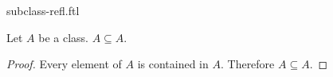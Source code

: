 \documentclass{stex}
\begin{document}
\begin{smodule}{subclass-refl.ftl}

  \begin{forthel}
  \end{forthel}

  \begin{forthel}
    \begin{proposition}
      Let $A$ be a class.
      $A \subseteq A$.
    \end{proposition}
    \begin{proof}
      Every element of $A$ is contained in $A$.
      Therefore $A \subseteq A$.
    \end{proof}
  \end{forthel}
\end{smodule}
\end{document}
